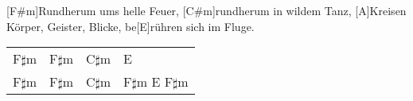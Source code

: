 \begin{guitar}
	 
	[F#m]Rundherum ums helle Feuer, [C#m]rundherum in wildem Tanz,
	[A]Kreisen Körper, Geister, Blicke, be[E]rühren sich im Fluge.
	
	{\footnotesize\begin{tabular}{|l|l|l|l|}
			F$\sharp$m & F$\sharp$m & C$\sharp$m & E \\
			F$\sharp$m & F$\sharp$m & C$\sharp$m & F$\sharp$m E F$\sharp$m
	\end{tabular}} 
\end{guitar}